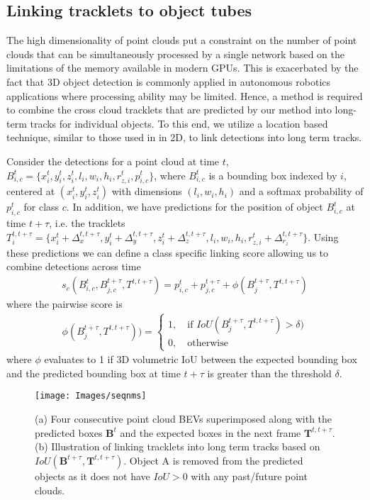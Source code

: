 \documentclass[10pt,twocolumn,letterpaper]{article}
\begin{document}
\subsection{Linking tracklets to object tubes}\label{sec:method:tracklets_to_tubes}
The high dimensionality of point clouds put a constraint on the number of point clouds that can be simultaneously processed by a single network based on the limitations of the memory available in modern GPUs. This is exacerbated by the fact that 3D object detection is commonly applied in autonomous robotics applications where processing ability may be limited. Hence, a method is required to combine the cross cloud tracklets that are predicted by our method into long-term tracks for individual objects. To this end, we utilize a location based technique, similar to those used in \cite{Feichtenhofer2017,Han2016} in 2D, to link detections into long term tracks.

Consider the detections for a point cloud at time $t$, $B_{i,c}^{t} = \{x_i^t, y_i^t, z_i^t, l_i, w_i, h_i, r_{z,i}^t, p_{i,c}^t\}$, where $B_{i,c}^{t}$ is a bounding box indexed by $i$, centered at $(x_i^t, y_i^t, z_i^t)$ with dimensions $(l_i, w_i, h_i)$ and a softmax probability of $p_{i,c}^t$ for class $c$. In addition, we have predictions for the position of object $B_{i,c}^t$ at time $t+\tau$, i.e. the tracklets $T_i^{t, t+\tau} = \{x_i^t+\Delta_{x}^{t,t+\tau}, y_i^t+\Delta_{y}^{t,t+\tau}, z_i^t+\Delta_{z}^{t,t+\tau}, l_i, w_i, h_i, r_{z,i}^t+\Delta_{r_z}^{t,t+\tau}\}$. Using these predictions we can define a class specific linking score allowing us to combine detections across time
\begin{align}\label{eq:link_score}
   s_c(B_{i,c}^t, B_{j,c}^{t+\tau}, T^{t,t+\tau}) = p_{i,c}^t + p_{j,c}^{t+\tau} + \phi(B_j^{t+\tau}, T^{t,t+\tau})
\end{align}
where the pairwise score is
\begin{align}\label{eq:pairwise_score}
   \phi(B_j^{t+\tau}, T^{t,t+\tau})) = \begin{cases}
      1,\quad\text{if } IoU(B_j^{t+\tau}, T^{t,t+\tau})>\delta)\\
      0,\quad\text{otherwise}
   \end{cases}
\end{align}
where $\phi$ evaluates to 1 if 3D volumetric IoU between the expected bounding box and the predicted bounding box at time $t+\tau$ is greater than the threshold $\delta$.
\begin{figure}[t]
   \begin{center}
   \texttt{[image: Images/seqnms]}
   \end{center}
      \caption{(a) Four consecutive point cloud BEVs superimposed along with the predicted boxes $\mathbf{B}^t$ and the expected boxes in the next frame $\mathbf{T}^{t,t+\tau}$. (b) Illustration of linking tracklets into long term tracks based on $IoU(\mathbf{B}^{t+\tau}, \mathbf{T}^{t,t+\tau})$. Object A is removed from the predicted objects as it does not have $IoU>0$ with any past/future point clouds.}
   \label{fig:seqnms}
\end{figure}
\end{document}
